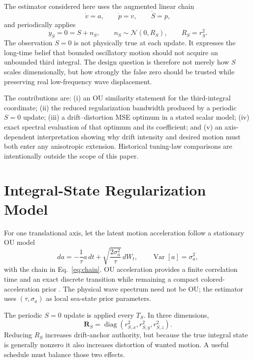 \documentclass[conference]{IEEEtran}
\DeclareRobustCommand{\mat}[1]{\bm{#1}}
\DeclareMathOperator{\Var}{Var}
\DeclareMathOperator{\diag}{diag}
\theoremstyle{remark}
\begin{document}
The estimator considered here uses the augmented linear chain
\begin{equation}
 \dot v=a,\qquad \dot p=v,\qquad \dot S=p,
 \label{eq:chain}
\end{equation}
and periodically applies
\begin{equation}
 y_S=0=S+n_S,\qquad n_S\sim\mathcal N(0,R_S),
 \qquad R_S=r_S^2.
 \label{eq:pseudo}
\end{equation}
The observation $S=0$ is not physically true at each update.  It expresses the
long-time belief that bounded oscillatory motion should not acquire an
unbounded third integral.  The design question is therefore not merely how $S$
scales dimensionally, but how strongly the false zero should be trusted while
preserving real low-frequency wave displacement.

The contributions are: (i) an OU similarity statement for the third-integral
coordinate; (ii) the reduced regularization bandwidth produced by a periodic
$S=0$ update; (iii) a drift--distortion MSE optimum in a stated scalar model;
(iv) exact spectral evaluation of that optimum and its coefficient; and (v) an
axis-dependent interpretation showing why drift intensity and desired motion
must both enter any anisotropic extension.  Historical tuning-law comparisons
are intentionally outside the scope of this paper.

\section{Integral-State Regularization Model}
\label{sec:model}

For one translational axis, let the latent motion acceleration follow a
stationary OU model
\begin{equation}
 da=-\frac{1}{\tau}a\,dt
 +\sqrt{\frac{2\sigma_a^2}{\tau}}\,dW_t,
 \qquad \Var[a]=\sigma_a^2,
 \label{eq:ou}
\end{equation}
with the chain in Eq.~\eqref{eq:chain}.  OU acceleration provides a finite
correlation time and an exact discrete transition while remaining a compact
colored-acceleration prior \cite{UhlenbeckOrnstein1930_OU}.  The physical wave
spectrum need not be OU; the estimator uses $(\tau,\sigma_a)$ as local
sea-state prior parameters.

The periodic $S=0$ update is applied every $T_S$.  In three dimensions,
\begin{equation}
 \mat R_S=\diag(r_{S,x}^2,r_{S,y}^2,r_{S,z}^2).
 \label{eq:RS3}
\end{equation}
Reducing $R_S$ increases drift-anchor authority, but because the true integral
state is generally nonzero it also increases distortion of wanted motion.  A
useful schedule must balance those two effects.
\end{document}

